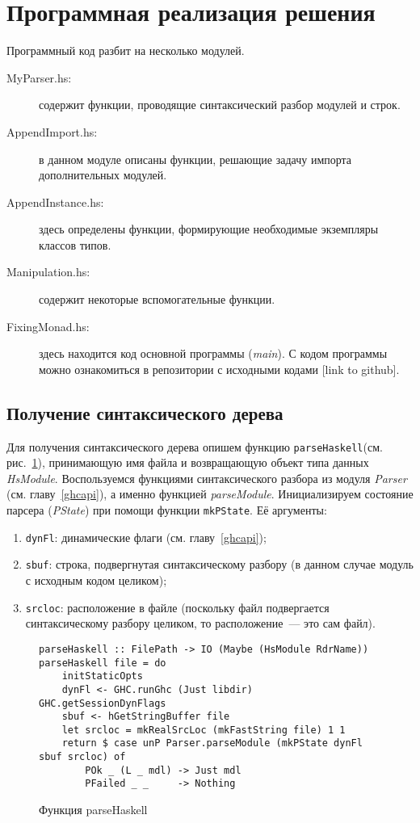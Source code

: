 \section{Программная реализация решения}
Программный код разбит на несколько модулей.
\begin{description}
    \item[MyParser.hs:] содержит функции, проводящие синтаксический разбор модулей и строк.
    \item[AppendImport.hs:] в данном модуле описаны функции, решающие задачу импорта дополнительных модулей.
    \item[AppendInstance.hs:] здесь определены функции, формирующие необходимые экземпляры классов типов.
    \item[Manipulation.hs:] содержит некоторые вспомогательные функции.
    \item[FixingMonad.hs:] здесь находится код основной программы (\textit{main}).
    С кодом программы можно ознакомиться в репозитории с исходными кодами [link to github].
\end{description}
\subsection{Получение синтаксического дерева}
Для получения синтаксического дерева опишем функцию \lstinline{parseHaskell}(см. рис.~\ref{parser}), принимающую имя файла и возвращающую объект типа данных \textit{HsModule}. Воспользуемся функциями синтаксического разбора из модуля \textit{Parser} (см. главу~\ref{ghcapi}), а именно функцией \textit{parseModule}. Инициализируем состояние парсера (\textit{PState}) при помощи функции \lstinline{mkPState}. Её аргументы:
\begin{enumerate}[1)]
\item \lstinline{dynFl}: динамические флаги (см. главу~\ref{ghcapi});
\item \lstinline{sbuf}: строка, подвергнутая синтаксическому разбору (в данном случае модуль с исходным кодом целиком);
\item \lstinline{srcloc}: расположение в файле (поскольку файл подвергается синтаксическому разбору целиком, то расположение~--- это сам файл).
\end{enumerate}

\begin{figure}[H]
\hrulefill
\begin{lstlisting}
parseHaskell :: FilePath -> IO (Maybe (HsModule RdrName))
parseHaskell file = do
    initStaticOpts
    dynFl <- GHC.runGhc (Just libdir) GHC.getSessionDynFlags
    sbuf <- hGetStringBuffer file
    let srcloc = mkRealSrcLoc (mkFastString file) 1 1
    return $ case unP Parser.parseModule (mkPState dynFl sbuf srcloc) of
        POk _ (L _ mdl) -> Just mdl
        PFailed _ _     -> Nothing
\end{lstlisting}
\hrulefill
\caption{Функция parseHaskell}\label{parser}
\end{figure}
